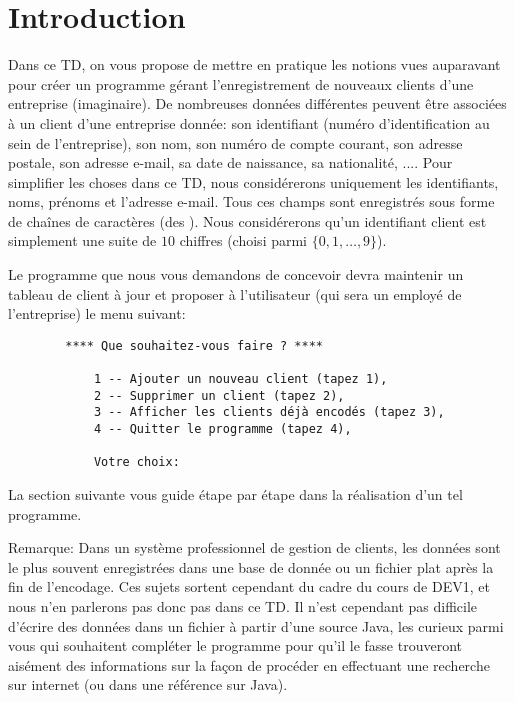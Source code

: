 \documentclass[a4paper,11pt]{article}
\date{2018 -- 2019}
\begin{document}
\entete
\titre
{}
\lastedit

\vspace{0.5cm}

	
\section{Introduction}

	Dans ce TD, on vous propose de mettre en pratique les notions vues auparavant pour créer un programme gérant l'enregistrement de nouveaux clients d'une entreprise (imaginaire). De nombreuses données différentes peuvent être associées à un client d'une entreprise donnée: son identifiant (numéro d'identification au sein de l'entreprise), son nom, son numéro de compte courant, son adresse postale, son adresse e-mail, sa date de naissance, sa nationalité, .... Pour simplifier les choses dans ce TD, nous considérerons uniquement les identifiants, noms, prénoms et l'adresse e-mail. Tous ces champs sont enregistr\'es sous forme de cha\^ines de caract\`eres (des ). Nous considérerons qu'un identifiant client est simplement une suite de $10$ chiffres (choisi parmi $\{0,1, \ldots, 9\}$).
	
	Le programme que nous vous demandons de concevoir devra maintenir un tableau de client \`a jour et proposer \`a l'utilisateur (qui sera un employ\'e de l'entreprise) le menu suivant:
	
	\begin{verbatim}
		**** Que souhaitez-vous faire ? ****
		
			1 -- Ajouter un nouveau client (tapez 1),
			2 -- Supprimer un client (tapez 2),
			3 -- Afficher les clients déjà encodés (tapez 3),
			4 -- Quitter le programme (tapez 4),
			
			Votre choix: 
	\end{verbatim}
	
La section suivante vous guide étape par étape dans la réalisation d'un tel programme.

Remarque: Dans un syst\`eme professionnel de gestion de clients, les données sont le plus souvent enregistr\'ees dans une base de donn\'ee ou un fichier plat apr\`es la fin de l'encodage. Ces sujets sortent cependant du cadre du cours de DEV1, et nous n'en parlerons pas donc pas dans ce TD. Il n'est cependant pas difficile d'écrire des donn\'ees dans un fichier \`a partir d'une source Java, les curieux parmi vous qui souhaitent compl\'eter le programme pour qu'il le fasse trouveront ais\'ement des informations sur la fa\c con de proc\'eder en effectuant une recherche sur internet (ou dans une r\'ef\'erence sur Java).
\end{document}
